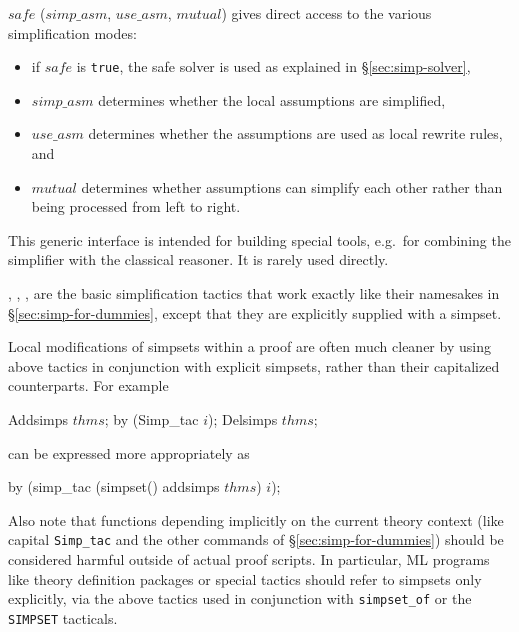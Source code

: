 \begin{ttdescription}
  
\item[\ttindexbold{generic_simp_tac} $safe$ ($simp\_asm$, $use\_asm$, $mutual$)] 
  gives direct access to the various simplification modes: 
  \begin{itemize}
  \item if $safe$ is {\tt true}, the safe solver is used as explained in
  \S\ref{sec:simp-solver},  
  \item $simp\_asm$ determines whether the local assumptions are simplified,
  \item $use\_asm$ determines whether the assumptions are used as local rewrite 
   rules, and
  \item $mutual$ determines whether assumptions can simplify each other rather
  than being processed from left to right. 
  \end{itemize}
  This generic interface is intended 
  for building special tools, e.g.\ for combining the simplifier with the 
  classical reasoner. It is rarely used directly.
  
\item[\ttindexbold{simp_tac}, \ttindexbold{asm_simp_tac},
  \ttindexbold{full_simp_tac}, \ttindexbold{asm_full_simp_tac}] are
  the basic simplification tactics that work exactly like their
  namesakes in \S\ref{sec:simp-for-dummies}, except that they are
  explicitly supplied with a simpset.
  
\end{ttdescription}

\medskip

Local modifications of simpsets within a proof are often much cleaner
by using above tactics in conjunction with explicit simpsets, rather
than their capitalized counterparts.  For example
\begin{ttbox}
Addsimps \(thms\);
by (Simp_tac \(i\));
Delsimps \(thms\);
\end{ttbox}
can be expressed more appropriately as
\begin{ttbox}
by (simp_tac (simpset() addsimps \(thms\)) \(i\));
\end{ttbox}

\medskip

Also note that functions depending implicitly on the current theory
context (like capital \texttt{Simp_tac} and the other commands of
\S\ref{sec:simp-for-dummies}) should be considered harmful outside of
actual proof scripts.  In particular, ML programs like theory
definition packages or special tactics should refer to simpsets only
explicitly, via the above tactics used in conjunction with
\texttt{simpset_of} or the \texttt{SIMPSET} tacticals.


